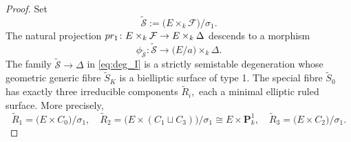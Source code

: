 \documentclass[10pt,a4paper]{amsart}
\newcommand{\bbP}{\mathbf{P}}
\newcommand{\ca}[1]{{\mathcal{#1}}}
\newcommand{\pr}{\textnormal{pr}}
\begin{document}
\begin{proof}
Set \begin{equation}\label{eq:deg_I}
\widetilde{\ca S}:=\bigl(E\times_{k}\ca F\bigr)/\sigma_{1}.\end{equation} The natural projection $\pr_{1}\colon E\times_{k}\ca F\to E\times_{k}\Delta$ descends to a morphism \begin{equation}\label{eq:albanese_I}\phi_{\widetilde{\ca S}}\colon \widetilde{\ca S}\longrightarrow \bigl(E/a\bigr)\times_{k}\Delta .\end{equation}
The family $\widetilde{\ca S}\to \Delta$ in \eqref{eq:deg_I} is a strictly semistable degeneration whose geometric generic fibre $\widetilde{S}_{K}$ is a bielliptic surface of type 1. The special fibre $\widetilde{S}_{0}$ has exactly three irreducible components $\widetilde{R}_{i},$ each a minimal elliptic ruled surface. More precisely, 
\begin{equation}\label{eq:components_I}
\widetilde{R}_{1} = \bigl(E \times C_0\bigr)/\sigma_1,\quad
\widetilde{R}_{2} =\bigl( E \times (C_1 \sqcup C_3)\bigr)/\sigma_1 \cong E \times \bbP^1_k,\quad
\widetilde{R}_{3} = \bigl(E \times C_2\bigr)/\sigma_1 .
\end{equation}


\end{proof}
\end{document}
